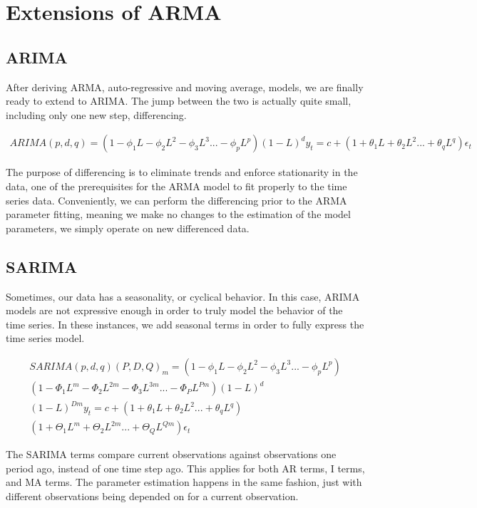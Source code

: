 \documentclass{article}
\begin{document}
\section{Extensions of ARMA}
\subsection{ARIMA}
    After deriving ARMA, auto-regressive and moving average, models, we are finally ready to extend to ARIMA. The jump between the two is actually quite small, including only one new step, differencing. 
    
    \begin{align*}
    ARIMA(p, d, q) = (1 - \phi_{1}L - \phi_{2}L^{2} - \phi_{3}L^{3}... - \phi_{p}L^{p}) (1 - L)^{d} y_{t} = c + (1 + \theta_{1} L + \theta_{2} L^{2}... + \theta_{q} L^{q}) \epsilon_{t}
    \end{align*}
    
    The purpose of differencing is to eliminate trends and enforce stationarity in the data, one of the prerequisites for the ARMA model to fit properly to the time series data. Conveniently, we can perform the differencing prior to the ARMA parameter fitting, meaning we make no changes to the estimation of the model parameters, we simply operate on new differenced data.
    
\subsection{SARIMA}
    Sometimes, our data has a seasonality, or cyclical behavior. In this case, ARIMA models are not expressive enough in order to truly model the behavior of the time series. In these instances, we add seasonal terms in order to fully express the time series model.
    
    \begin{align*}
    SARIMA(p, d, q) (P, D, Q)_{m} = (1 - \phi_{1}L - \phi_{2}L^{2} - \phi_{3}L^{3}... - \phi_{p}L^{p}) \\(1 - \Phi_{1}L^{m} - \Phi_{2}L^{2m} - \Phi_{3}L^{3m}... - \Phi_{P}L^{Pm}) (1 - L)^{d} \\(1 - L)^{Dm} y_{t} = c + (1 + \theta_{1} L + \theta_{2} L^{2}... + \theta_{q} L^{q}) \\(1 + \Theta_{1} L^{m} + \Theta_{2} L^{2m}... + \Theta_{Q} L^{Qm}) \epsilon_{t}
    \end{align*}
    
    The SARIMA terms compare current observations against observations one period ago, instead of one time step ago. This applies for both AR terms, I terms, and MA terms. The parameter estimation happens in the same fashion, just with different observations being depended on for a current observation.
\end{document}

